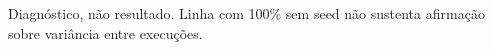 \footnotesize Diagnóstico, não resultado. Linha com 100\% sem seed não sustenta afirmação sobre variância entre execuções.
\normalsize
